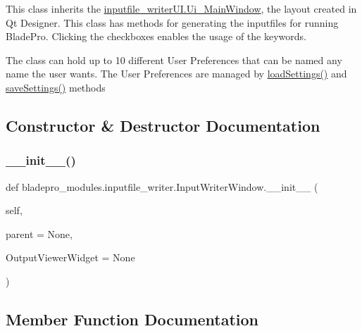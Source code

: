 This class inherits the \hyperlink{classbladepro__modules_1_1inputfile__writer_u_i_1_1_ui___main_window}{inputfile\+\_\+writer\+U\+I.\+Ui\+\_\+\+Main\+Window}, the layout created in Qt Designer. This class has methods for generating the inputfiles for running Blade\+Pro. Clicking the checkboxes enables the usage of the keywords.

The class can hold up to 10 different User Preferences that can be named any name the user wants. The User Preferences are managed by \hyperlink{classbladepro__modules_1_1inputfile__writer_1_1_input_writer_window_a0c4f30850537553db0ff2e27059733a4}{load\+Settings()} and \hyperlink{classbladepro__modules_1_1inputfile__writer_1_1_input_writer_window_a723573fade09f206a9c89569885558c1}{save\+Settings()} methods 

\subsection{Constructor \& Destructor Documentation}
\hypertarget{classbladepro__modules_1_1inputfile__writer_1_1_input_writer_window_a8b9718669dac6016ebe4e4f27421c7f2}{}\label{classbladepro__modules_1_1inputfile__writer_1_1_input_writer_window_a8b9718669dac6016ebe4e4f27421c7f2} 
\subsubsection{\texorpdfstring{\+\_\+\+\_\+init\+\_\+\+\_\+()}{\_\_init\_\_()}}
{\footnotesize\ttfamily def bladepro\+\_\+modules.\+inputfile\+\_\+writer.\+Input\+Writer\+Window.\+\_\+\+\_\+init\+\_\+\+\_\+ (\begin{DoxyParamCaption}\item[{}]{self,  }\item[{}]{parent = {\ttfamily None},  }\item[{}]{Output\+Viewer\+Widget = {\ttfamily None} }\end{DoxyParamCaption})}



\subsection{Member Function Documentation}
\hypertarget{classbladepro__modules_1_1inputfile__writer_1_1_input_writer_window_abf54bdb00a2743fb488463ab7247b146}{}\label{classbladepro__modules_1_1inputfile__writer_1_1_input_writer_window_abf54bdb00a2743fb488463ab7247b146} 
